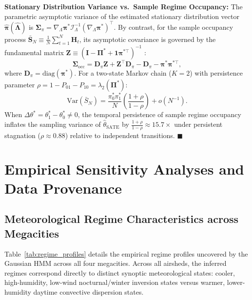 \documentclass[twoside]{article}
\theoremstyle{definition}
\newcommand{\Var}{\mathrm{Var}}
\begin{document}
\textbf{Stationary Distribution Variance vs.\ Sample Regime Occupancy:}
The parametric asymptotic variance of the estimated stationary distribution vector $\hat{\boldsymbol{\pi}}(\hat{\boldsymbol{\Lambda}})$ is $\boldsymbol{\Sigma}_\pi = \nabla_\Lambda \boldsymbol{\pi}^* \mathcal{I}_\Lambda^{-1} (\nabla_\Lambda \boldsymbol{\pi}^*)^\top$.
By contrast, for the sample occupancy process $\bar{\boldsymbol{S}}_N \equiv \frac{1}{N}\sum_{t=1}^N \boldsymbol{H}_t$, its asymptotic covariance is governed by the fundamental matrix $\mathbf{Z} \equiv (\mathbf{I} - \boldsymbol{\Pi}^* + \mathbf{1}\boldsymbol{\pi}^{*\top})^{-1}$ \citep{kemeny1976finite}:
\begin{equation}
    \boldsymbol{\Sigma}_{\mathrm{occ}} = \mathbf{D}_{\pi} \mathbf{Z} + \mathbf{Z}^\top \mathbf{D}_{\pi} - \mathbf{D}_{\pi} - \boldsymbol{\pi}^* \boldsymbol{\pi}^{*\top},
\end{equation}
where $\mathbf{D}_{\pi} = \mathrm{diag}(\boldsymbol{\pi}^*)$.
For a two-state Markov chain ($K=2$) with persistence parameter $\rho = 1 - P_{01} - P_{10} = \lambda_2(\boldsymbol{\Pi}^*)$:
\begin{equation}
    \Var(\bar{S}_N) = \frac{\pi_0^* \pi_1^*}{N} \left( \frac{1 + \rho}{1 - \rho} \right) + o(N^{-1}).
\end{equation}
When $\Delta \theta^* = \theta_1^* - \theta_0^* \neq 0$, the temporal persistence of sample regime occupancy inflates the sampling variance of $\hat{\theta}_{\mathrm{SATE}}$ by $\frac{1+\rho}{1-\rho} \approx 15.7\times$ under persistent stagnation ($\rho \approx 0.88$) relative to independent transitions. $\blacksquare$

\vspace{-2mm}
\section{Empirical Sensitivity Analyses and Data Provenance}
\label{app:empirical_sensitivity}

\subsection{Meteorological Regime Characteristics across Megacities}
\label{app:regime_profiles}
Table~\ref{tab:regime_profiles} details the empirical regime profiles uncovered by the Gaussian HMM across all four megacities. Across all airsheds, the inferred regimes correspond directly to distinct synoptic meteorological states: cooler, high-humidity, low-wind nocturnal/winter inversion states versus warmer, lower-humidity daytime convective dispersion states.
\end{document}
